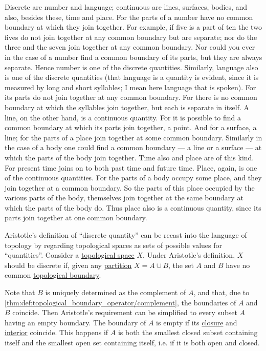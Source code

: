 \begin{concept}
\begin{displayquote}
    Discrete are number and language; continuous are lines, surfaces, bodies, and also, besides these, time and place. For the parts of a number have no common boundary at which they join together. For example, if five is a part of ten the two fives do not join together at any common boundary but are separate; nor do the three and the seven join together at any common boundary. Nor could you ever in the case of a number find a common boundary of its parts, but they are always separate. Hence number is one of the discrete quantities. Similarly, language also is one of the discrete quantities (that language is a quantity is evident, since it is measured by long and short syllables; I mean here language that is spoken). For its parts do not join together at any common boundary. For there is no common boundary at which the syllables join together, but each is separate in itself. A line, on the other hand, is a continuous quantity. For it is possible to find a common boundary at which its parts join together, a point. And for a surface, a line; for the parts of a place join together at some common boundary. Similarly in the case of a body one could find a common boundary --- a line or a surface --- at which the parts of the body join together. Time also and place are of this kind. For present time joins on to both past time and future time. Place, again, is one of the continuous quantities. For the parts of a body occupy some place, and they join together at a common boundary. So the parts of this place occupied by the various parts of the body, themselves join together at the same boundary at which the parts of the body do. Thus place also is a continuous quantity, since its parts join together at one common boundary.
  \end{displayquote}

  Aristotle's definition of \enquote{discrete quantity} can be recast into the language of topology by regarding topological spaces as sets of possible values for \enquote{quantities}. Consider a \hyperref[def:topological_space]{topological space} \( X \). Under Aristotle's definition, \( X \) should be discrete if, given any \hyperref[def:set_partition]{partition} \( X = A \cup B \), the set \( A \) and \( B \) have no common \hyperref[def:topological_boundary_operator]{topological boundary}.

  Note that \( B \) is uniquely determined as the complement of \( A \), and that, due to \cref{thm:def:topological_boundary_operator/complement}, the boundaries of \( A \) and \( B \) coincide. Then Aristotle's requirement can be simplified to every subset \( A \) having an empty boundary. The boundary of \( A \) is empty if its \hyperref[def:topological_closure_operator]{closure} and \hyperref[def:topological_interior_operator]{interior} coincide. This happens if \( A \) is both the smallest closed subset containing itself and the smallest open set containing itself, i.e. if it is both open and closed.


\end{concept}
